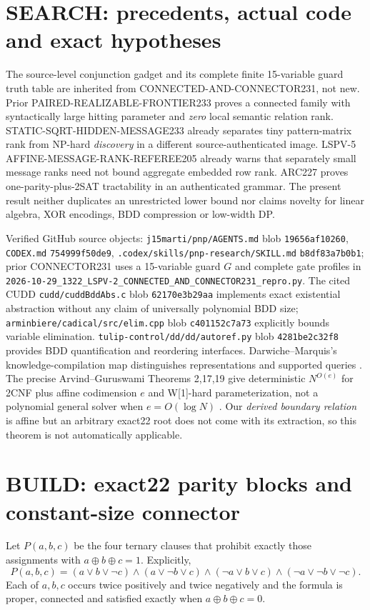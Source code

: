 \documentclass[10pt]{article}
\begin{document}
\section{SEARCH: precedents, actual code and exact hypotheses}
\noindent The source-level conjunction gadget and its complete finite 15-variable guard truth table are inherited from CONNECTED-AND-CONNECTOR231, not new. Prior PAIRED-REALIZABLE-FRONTIER233 proves a connected family with syntactically large hitting parameter and \emph{zero} local semantic relation rank. STATIC-SQRT-HIDDEN-MESSAGE233 already separates tiny pattern-matrix rank from NP-hard \emph{discovery} in a different source-authenticated image. LSPV-5 AFFINE-MESSAGE-RANK-REFEREE205 already warns that separately small message ranks need not bound aggregate embedded row rank. ARC227 proves one-parity-plus-2SAT tractability in an authenticated grammar. The present result neither duplicates an unrestricted lower bound nor claims novelty for linear algebra, XOR encodings, BDD compression or low-width DP.

\noindent Verified GitHub source objects: \texttt{j15marti/pnp/AGENTS.md} blob \texttt{19656af10260}, \texttt{CODEX.md} \texttt{754999f50de9}, \texttt{.codex/skills/pnp-research/SKILL.md} \texttt{b8df83a7b0b1}; prior CONNECTOR231 uses a 15-variable guard $G$ and complete gate profiles in \texttt{2026-10-29\_1322\_LSPV-2\_CONNECTED\_AND\_CONNECTOR231\_repro.py}. The cited CUDD \texttt{cudd/cuddBddAbs.c} blob \texttt{62170e3b29aa} implements exact existential abstraction without any claim of universally polynomial BDD size; \texttt{arminbiere/cadical/src/elim.cpp} blob \texttt{c401152c7a73} explicitly bounds variable elimination. \texttt{tulip-control/dd/dd/autoref.py} blob \texttt{4281be2c32f8} provides BDD quantification and reordering interfaces. Darwiche--Marquis's knowledge-compilation map distinguishes representations and supported queries \cite{dm}. The precise Arvind--Guruswami Theorems 2,17,19 give deterministic $N^{O(e)}$ for 2CNF plus affine codimension $e$ and W[1]-hard parameterization, not a polynomial general solver when $e=O(\log N)$ \cite{ag}. Our \emph{derived boundary relation} is affine but an arbitrary exact22 root does not come with its extraction, so this theorem is not automatically applicable.

\section{BUILD: exact22 parity blocks and constant-size connector}
\noindent Let $P(a,b,c)$ be the four ternary clauses that prohibit exactly those assignments with $a\oplus b\oplus c=1$. Explicitly,
\begin{equation}\label{eq:parity}
P(a,b,c)=(a\vee b\vee\neg c)\land(a\vee\neg b\vee c)
\land(\neg a\vee b\vee c)\land(\neg a\vee\neg b\vee\neg c).
\end{equation}
Each of $a,b,c$ occurs twice positively and twice negatively and the formula is proper, connected and satisfied exactly when $a\oplus b\oplus c=0$.
\end{document}
